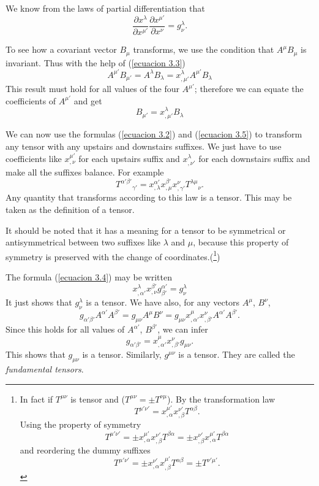 We know from the laws of partial differentiation that
\begin{equation}
 \label{ecuacion 3.4}
 \frac{\partial x^{\lambda}}{\partial x^{\mu'}} 
\frac{\partial x^{\mu'}}{\partial x^{\nu}} = g^{\lambda}_{\nu}.
\end{equation}

To see how a covariant vector $B_{\mu}$ transforms, we use the condition that 
$A^{\mu} B_{\mu}$ is invariant. Thus with the help of (\ref{ecuacion 3.3})
\[
    A^{\mu'} B_{\mu'} 
    = A^{\lambda} B_{\lambda} 
    = x^{\lambda}_{,\mu'}A^{\mu'} B_{\lambda}
\]
This result must hold for all values of the four $A^{\mu'}$; therefore we can 
equate the coefficients of $A^{\mu'}$ and get
\begin{equation}
 \label{ecuacion 3.5}
 B_{\mu'} = x^{\lambda}_{,\mu'} B_{\lambda}
\end{equation}

We can now use the formulas (\ref{ecuacion 3.2}) and (\ref{ecuacion 3.5}) to 
transform any tensor with any upstairs and downstairs suffixes. We just have to 
use coefficients like $x^{\mu'}_{,\nu}$ for each upstairs suffix and 
$x^{\lambda}_{,\nu'}$ for each downstairs suffix and make all the suffixes 
balance. For example
\begin{equation}
 \label{ecuacion 3.6}
 {T^{\alpha'\beta'}}_{\gamma'} =
    x^{\alpha'}_{,\lambda}x^{\beta'}_{,\mu}x^{\nu}_{,\gamma'} 
    {T^{\lambda\mu}}_{\nu}.
\end{equation}
Any quantity that transforms according to this law is a tensor. This may be 
taken as the definition of a tensor.

It should be noted that it has a meaning for a tensor to be symmetrical or 
antisymmetrical between two suffixes like $\lambda$ and $\mu$, because this 
property of symmetry is preserved with the change of coordinates.(\footnote{
In fact if $T^{\mu\nu}$ is tensor and ($T^{\mu\nu} = \pm T^{\nu\mu}$). By 
the transformation law 
\[T^{\mu'\nu'} = x^{\mu'}_{,\alpha} x^{\nu'}_{,\beta}T^{\alpha\beta}.\]
Using the property of symmetry
\[T^{\mu'\nu'} = \pm x^{\mu'}_{,\alpha} x^{\nu'}_{,\beta}T^{\beta\alpha}
               = \pm x^{\nu'}_{,\beta}  x^{\mu'}_{,\alpha}T^{\beta\alpha}\]
and reordering the dummy suffixes
\[T^{\mu'\nu'} = \pm x^{\nu'}_{,\alpha} x^{\mu'}_{,\beta}T^{\alpha\beta}
               = \pm T^{\nu'\mu'}.\]
})

The formula (\ref{ecuacion 3.4}) may be written
\[
    x^{\lambda}_{,\alpha'}x^{\beta'}_{,\nu} 
    g^{\alpha'}_{\beta'} = g^{\lambda}_{\nu}
\]
It just shows that $g^{\lambda}_{\nu}$ is a tensor. We have also, for any 
vectors $A^\mu$, $B^\nu$,
\[
    g_{\alpha'\beta'} A^{\alpha'} A^{\beta'} = g_{\mu\nu} A^\mu B^\nu
    = g_{\mu\nu} x^{\mu}_{,\alpha'} x^{\nu}_{,\beta'} A^{\alpha'} A^{\beta'}.
\]
Since this holds for all values of $A^{\alpha'}$, $B^{\beta'}$, we can infer
\begin{equation}
 \label{ecuacion 3.7}
 g_{\alpha'\beta'} = x^{\mu}_{,\alpha'} x^{\nu}_{,\beta'} g_{\mu\nu}.
\end{equation}
This shows that $g_{\mu\nu}$ is a tensor. Similarly, $g^{\mu\nu}$ is a tensor. 
They are called the \emph{fundamental tensors}.


